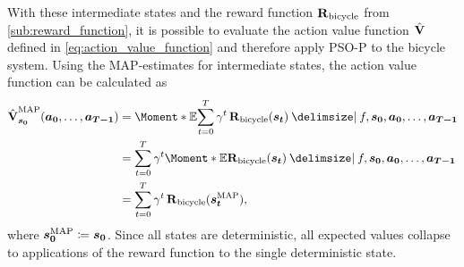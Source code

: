 With these intermediate states and the reward function $\operatorname{\operatorname{\mathbf{R}}_{\text{bicycle}}}$ from \cref{sub:reward_function}, it is possible to evaluate the action value function $\operatorname{\hat{\operatorname{\mathbf{V}}}}$ defined in \cref{eq:action_value_function} and therefore apply PSO-P to the bicycle system.
Using the MAP-estimates for intermediate states, the action value function can be calculated as
\begin{align}
    \label{eq:map_action_value_function}
    \begin{split}
        \map{\AVlu}_{\mat{s_0}}(\mat{a_0}, \dots, \mat{a_{T-1}}) &= \Moment*{\E}{\sum_{t=0}^T \gamma^t \RwdBicycle(\mat{s_t}) \given f, \mat{s_0}, \mat{a_0}, \dots, \mat{a_{T-1}}} \\
        &= \sum_{t=0}^T \gamma^t \Moment*{\E}{\RwdBicycle(\mat{s_t}) \given f, \mat{s_0}, \mat{a_0}, \dots, \mat{a_{T-1}}} \\
        &= \sum_{t=0}^T \gamma^t \RwdBicycle(\map{\mat{s_t}}),
    \end{split}
\end{align}
where $\bm{s_0}^{\text{MAP}} \coloneqq \bm{s_0}$.
Since all states are deterministic, all expected values collapse to applications of the reward function to the single deterministic state.

